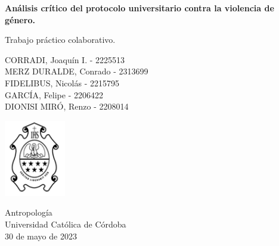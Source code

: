 \begin{titlepage}
    \begin{center}
        \vspace*{1cm}
            
        \Huge
        \textbf{Análisis crítico del protocolo universitario contra la violencia de género.}
            
        \vspace{0.5cm}
        \LARGE
        Trabajo práctico colaborativo.
            
        \vspace{1.5cm}
            
        CORRADI, Joaquín I. - 2225513\\
        MERZ DURALDE, Conrado - 2313699\\
        FIDELIBUS, Nicolás - 2215795\\
        GARCÍA, Felipe - 2206422\\
        DIONISI MIRÓ, Renzo - 2208014
            
        \vfill
            
        \vspace{0.8cm}
            
        \includegraphics[width=0.2\textwidth]{logoucc.png}
            
        \Large
        Antropología\\
        Universidad Católica de Córdoba\\
        30 de mayo de 2023
            
    \end{center}
\end{titlepage}
